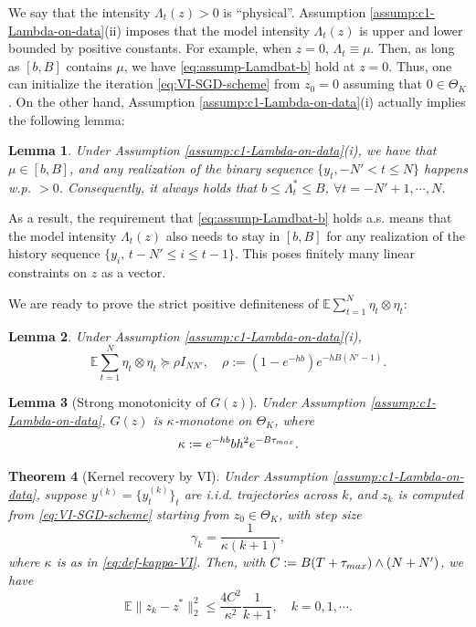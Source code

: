 \documentclass[11pt]{article}
\newtheorem{theorem}{Theorem}[section]
\newtheorem{lemma}[theorem]{Lemma}
\theoremstyle{remark}
\theoremstyle{plain}
\newcommand{\E}{\mathbb{E}}
\begin{document}
We say that the intensity $\Lambda_t (z) > 0$ is ``physical''. 
Assumption \ref{assump:c1-Lambda-on-data}(ii)  imposes that the model intensity
$\Lambda_t (z) $ is upper and lower bounded by positive constants. 
For example, when $z = 0$, $\Lambda_t \equiv \mu$.
Then, as long as $[b, B]$ contains $\mu$, we have \eqref{eq:assump-Lamdbat-b} hold at $z=0$. 
Thus, one can initialize the iteration \eqref{eq:VI-SGD-scheme} from $z_0 = 0$ assuming that $0 \in \Theta_K$.
%
On the other hand, Assumption \ref{assump:c1-Lambda-on-data}(i) actually implies the following lemma:

\begin{lemma}\label{lemma:c1-Lambda-on-data-implication}
Under Assumption \ref{assump:c1-Lambda-on-data}(i), 
we have that $\mu \in [b,B]$, and any realization of the binary sequence $\{y_t, -N' <  t \le N\}$ happens w.p. $> 0$. Consequently, it always holds that $b \le \Lambda_t^*  \le B$, $\forall t= -N'+1, \cdots, N$. 
\end{lemma}



As a result, the requirement that \eqref{eq:assump-Lamdbat-b} holds a.s. means that the model intensity $\Lambda_t(z)$ also needs to stay in $[b,B]$ for any realization of the history sequence $\{ y_i, \, t - N'\le i \le t-1 \}$. This poses finitely many linear constraints on $z$ as a vector. 

We are ready to prove the strict positive definiteness of  $\E  \sum_{t= 1}^N \eta_t \otimes \eta_t $:

\begin{lemma}\label{lemma:eta-eta-positivity}
Under Assumption \ref{assump:c1-Lambda-on-data}(i),
\[
\E     \sum_{t= 1}^N \eta_t \otimes \eta_t   
\succeq  \rho I_{NN'},
\quad \rho := (1-e^{-hb})e^{-hB (N'-1)}.
\]
\end{lemma}





\begin{lemma}[Strong monotonicity of $G(z)$]\label{lemma:G-kappa-monotone}
Under Assumption \ref{assump:c1-Lambda-on-data}, 
$G(z)$ is $\kappa$-monotone on $\Theta_K$, where
\begin{equation}\label{eq:def-kappa-VI}
\kappa :=  e^{-hb} b h^2  e^{- B \tau_{\rm max}}.
\end{equation}
\end{lemma}



\begin{theorem}[Kernel recovery by VI]\label{thm:VI-convergence}
Under Assumption \ref{assump:c1-Lambda-on-data}, 
suppose $y^{(k)} = \{ y_t^{(k)} \}_t$ are i.i.d. trajectories across $k$,
and $z_k$ is computed from \eqref{eq:VI-SGD-scheme} starting from $z_0 \in \Theta_K$,
with step size
\[
\gamma_k = \frac{1}{\kappa (k+1)},
\]
where $\kappa$ is as in \eqref{eq:def-kappa-VI}.
Then, with $C:= B(T+ \tau_{\rm max} )  \wedge (N + N')$, 
we have
\[
\E \|z_k - z^* \|_2^2 \le \frac{4 C^2 }{\kappa^2} \frac{1}{k+1}, \quad k = 0, 1,  \cdots.
\]
\end{theorem}
\end{document}
